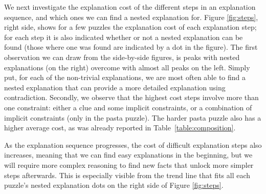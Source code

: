 
We next investigate the explanation cost of the different steps in an explanation sequence, and which ones we can find a nested explanation for. 
Figure \ref{fig:steps}, right side, shows for a few puzzles the explanation cost of each explanation step; for each step it is also indicated whether or not a nested explanation can be found (those where one was found are indicated by a dot in the figure). 
The first observation we can draw from the side-by-side figures, is peaks with nested explanations (on the right) overcome with almost all peaks on the left. Simply put, for each of the non-trivial explanations, we are most often able to find a nested explanation that can provide a more detailed explanation using contradiction. 
Secondly, we observe that the highest cost steps involve more than one constraint: either a clue and some implicit constraints, or a combination of implicit constraints (only in the pasta puzzle). 
The harder pasta puzzle also has a higher average cost, as was already reported in Table~\ref{table:composition}. 

As the explanation sequence progresses, the cost of difficult explanation steps also increases, meaning that we can find easy explanations in the beginning, but we will require more complex reasoning to find new facts that unlock more simpler steps afterwards. 
This is especially visible from the trend line that fits all each puzzle's nested explanation dots on the right side of Figure \ref{fig:steps}. 


